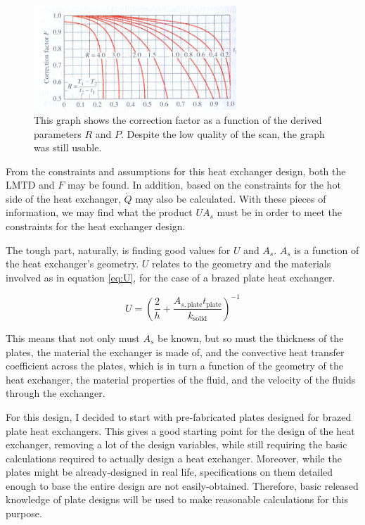 \documentclass[12pt,letterpaper]{article}
\begin{document}
\begin{figure}
\center
\label{fig:correction-factor}
\includegraphics[width=3.0in]{correction-factor.png}
\caption{This graph shows the correction factor as a function of the derived parameters \(R\) and \(P\). Despite the low quality of the scan, the graph was still usable.}
\end{figure}

From the constraints and assumptions for this heat exchanger design, both the LMTD and \(F\) may be found.  In addition, based on the constraints for the hot side of the heat exchanger, \(\dot{Q}\) may also be calculated. With these pieces of information, we may find what the product \(UA_s\) must be in order to meet the constraints for the heat exchanger design. 

The tough part, naturally, is finding good values for \(U\) and \(A_s\). \(A_s\) is a function of the heat exchanger's geometry.  \(U\) relates to the geometry and the materials involved as in equation \ref{eq:U}, for the case of a brazed plate heat exchanger.

\begin{equation}
\label{eq:U}
U = \left(\frac{2}{h} + \frac{A_{s, \textrm{plate}} t_{\textrm{plate}}}{k_{\textrm{solid}}} \right)^{-1}
\end{equation}

This means that not only must \(A_s\) be known, but so must the thickness of the plates, the material the exchanger is made of, and the convective heat transfer coefficient across the plates, which is in turn a function of the geometry of the heat exchanger, the material properties of the fluid, and the velocity of the fluids through the exchanger.

For this design, I decided to start with pre-fabricated plates designed for brazed plate heat exchangers. This gives a good starting point for the design of the heat exchanger, removing a lot of the design variables, while still requiring the basic calculations required to actually design a heat exchanger. Moreover, while the plates might be already-designed in real life, specifications on them detailed enough to base the entire design are not easily-obtained. Therefore, basic released knowledge of plate designs will be used to make reasonable calculations for this purpose.
\end{document}
